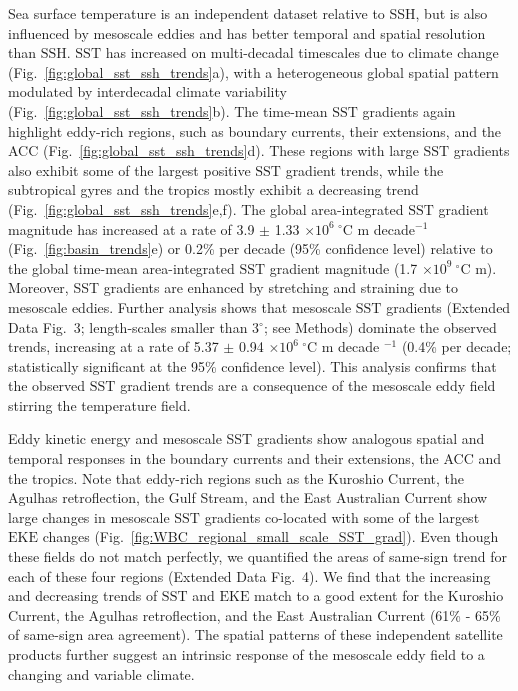 \documentclass{nature}
\newcommand{\EKE}{\text{EKE}}
\newcommand{\SST}{\text{SST}}
\newcommand{\SSH}{\text{SSH}}
\begin{document}
Sea surface temperature is an independent dataset relative to SSH, but is also influenced by mesoscale eddies and has better temporal and spatial resolution than $\SSH$. $\SST$ has increased on multi-decadal timescales due to climate change\cite{Cane_sst_trends_1997,Ruela_SST_2020} (Fig.~\ref{fig:global_sst_ssh_trends}a), with a heterogeneous global spatial pattern modulated by interdecadal climate variability\cite{Cane_SST_trends_2997} (Fig.~\ref{fig:global_sst_ssh_trends}b).
The time-mean $\SST$ gradients again highlight eddy-rich regions, such as boundary currents, their extensions, and the ACC (Fig.~\ref{fig:global_sst_ssh_trends}d). These regions with large $\SST$ gradients also exhibit some of the largest positive $\SST$ gradient trends, while the subtropical gyres and the tropics mostly exhibit a decreasing trend (Fig.~\ref{fig:global_sst_ssh_trends}e,f). The global area-integrated $\SST$ gradient magnitude has increased at a rate of 3.9 $\pm$ 1.33 $ \mathrm{\times10}^{6}\ ^\circ \mathrm{C}$ m decade$^{-1}$ (Fig.~\ref{fig:basin_trends}e) or 0.2\% per decade (95\% confidence level) relative to the global time-mean area-integrated $\SST$ gradient magnitude (1.7 $\mathrm{\times10}^{9}\ ^\circ \mathrm{C}$ m). Moreover, SST gradients are enhanced by stretching and straining due to mesoscale eddies. Further analysis shows that mesoscale $\SST$ gradients (Extended Data Fig.~3; length-scales smaller than 3$^\circ$; see Methods) dominate the observed trends, increasing at a rate of 5.37 $\pm$ 0.94 $ \mathrm{\times10}^{6}\ ^\circ \mathrm{C}$ m decade $^{-1}$ (0.4\% per decade; statistically significant at the 95\% confidence level). This analysis confirms that the observed $\SST$ gradient trends are a consequence of the mesoscale eddy field stirring the temperature field.

Eddy kinetic energy and mesoscale SST gradients show analogous spatial and temporal responses in the boundary currents and their extensions, the ACC and the tropics. Note that eddy-rich regions such as the Kuroshio Current, the Agulhas retroflection, the Gulf Stream, and the East Australian Current show large changes in mesoscale $\SST$ gradients co-located with some of the largest $\EKE$ changes (Fig.~\ref{fig:WBC_regional_small_scale_SST_grad}). Even though these fields do not match perfectly, we quantified the areas of same-sign trend for each of these four regions (Extended Data Fig.~4). We find that the increasing and decreasing trends of $\SST$ and $\EKE$ match to a good extent for the Kuroshio Current, the Agulhas retroflection, and the East Australian Current (61\% - 65\% of same-sign area agreement). The spatial patterns of these independent satellite products further suggest an intrinsic response of the mesoscale eddy field to a changing and variable climate.
\end{document}
